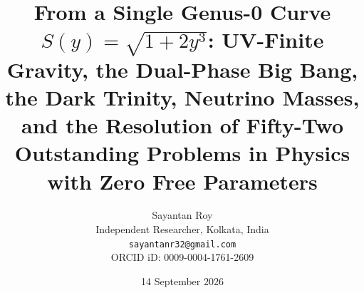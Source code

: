 \documentclass[a4paper,7pt,oneside,openany]{book}
\begin{document}
\title{\textbf{From a Single Genus-0 Curve $S(y) = \sqrt{1+2y^3}$: UV-Finite Gravity, the Dual-Phase Big Bang, the Dark Trinity, Neutrino Masses, and the Resolution of Fifty-Two Outstanding Problems in Physics with Zero Free Parameters}}

\author{Sayantan Roy\\
Independent Researcher, Kolkata, India\\
\texttt{sayantanr32@gmail.com}\\
ORCID iD: 0009-0004-1761-2609}

\date{14 September 2026}


\maketitle

\tableofcontents
\newpage
\end{document}
